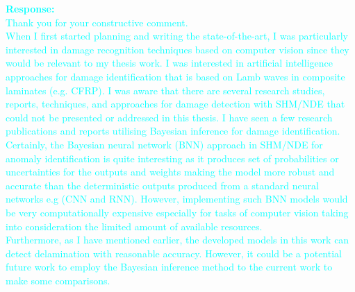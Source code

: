 \documentclass[11pt,a2paper]{report}
\begin{document}
{\begin{enumerate}
		\textcolor{Cyan}{
			\textbf{Response:} \\
			Thank you for your constructive comment. \\
			When I first started planning and writing the state-of-the-art, I was particularly interested in damage recognition techniques based on computer vision since they would be relevant to my thesis work.
			I was interested in artificial intelligence approaches for damage identification that is based on Lamb waves in composite laminates (e.g. CFRP).
			I was aware that there are several research studies, reports, techniques, and approaches for damage detection with SHM/NDE that could not be presented or addressed in this thesis.
			I have seen a few research publications and reports utilising Bayesian inference for damage identification.
			Certainly, the Bayesian neural network (BNN) approach in SHM/NDE for anomaly identification is quite interesting as it produces set of probabilities or uncertainties for the outputs and weights making the model more robust and accurate than the deterministic outputs produced from a standard neural networks e.g (CNN and RNN).
			However, implementing such BNN models would be very computationally expensive especially for tasks of computer vision taking into consideration the limited amount of available resources.
			\\
			Furthermore, as I have mentioned earlier, the developed models in this work can detect delamination with reasonable accuracy.
			However, it could be a potential future work to employ the Bayesian inference method to the current work to make some comparisons.
		}
	\end{enumerate}
}
\end{document}
